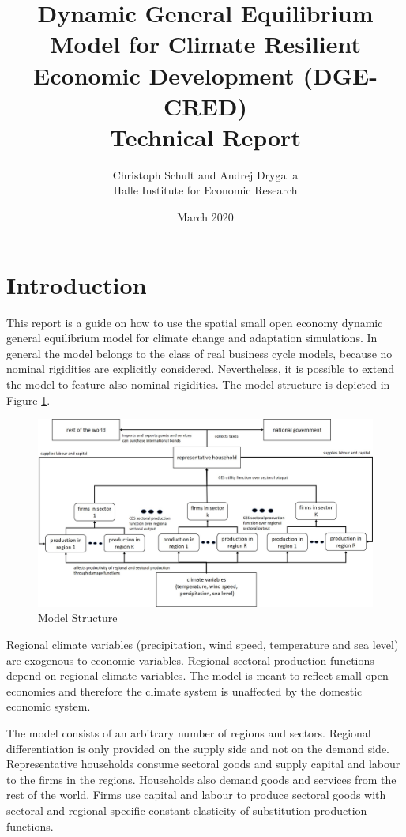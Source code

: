 \documentclass[10pt,a4paper]{article}
\title{Dynamic General Equilibrium Model for Climate Resilient Economic Development (DGE-CRED)\\
\large{Technical Report}}
\date{March 2020}
\author{Christoph Schult and Andrej Drygalla \\ Halle Institute for Economic Research}
\begin{document}
\maketitle

\section{Introduction}
This report is a guide on how to use the spatial small open economy dynamic general equilibrium model for climate change and adaptation simulations. In general the model belongs to the class of real business cycle models, because no nominal rigidities are explicitly considered. Nevertheless, it is possible to extend the model to feature also nominal rigidities. The model structure is depicted in Figure \ref{fig:ModelStructure}.
\begin{figure}[h]
\caption{Model Structure}\label{fig:ModelStructure}
\includegraphics[width = 1\textwidth, height = 0.7\textwidth]{ModelStructure.jpg}
\end{figure}
Regional climate variables (precipitation, wind speed, temperature and sea level) are exogenous to economic variables. Regional sectoral production functions depend on regional climate variables. The model is meant to reflect small open economies and therefore the climate system is unaffected by the domestic economic system.

The model consists of an arbitrary number of regions and sectors. Regional differentiation is only provided on the supply side and not on the demand side. Representative households consume sectoral goods and supply capital and labour to the firms in the regions. Households also demand goods and services from the rest of the world. Firms use capital and labour to produce sectoral goods with sectoral and regional specific constant elasticity of substitution production functions.
\end{document}
